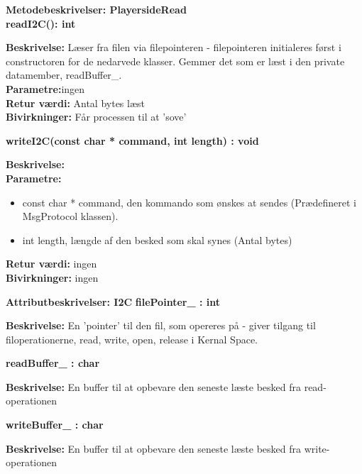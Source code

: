 \documentclass[Softwaredesign/Softwaredesign_main.tex]{subfiles}
\begin{document}
{\large\textbf{Metodebeskrivelser: PlayersideRead}}\\[0.2cm]
\textbf{readI2C(): int}
\begin{adjustwidth}{1cm}{0pt}
\textbf{Beskrivelse:} Læser fra filen via filepointeren - filepointeren initialeres først i constructoren for de nedarvede klasser. Gemmer det som er læst i den private datamember, readBuffer\_.\\[0.2cm]
\textbf{Parametre:}ingen \\[0.2cm]
\textbf{Retur værdi:} Antal bytes læst \\[0.2cm]
\textbf{Bivirkninger:} Får processen til at 'sove'\\[0.2cm]
\end{adjustwidth}

\textbf{writeI2C(const char * command, int length) : void}
\begin{adjustwidth}{1cm}{0pt}
\textbf{Beskrivelse:} \\[0.2cm]
\textbf{Parametre:} 
\begin{itemize}
    \item const char * command, den kommando som ønskes at sendes (Prædefineret i MsgProtocol klassen).
    \item int length, længde af den besked som skal synes (Antal bytes) 
\end{itemize}
\textbf{Retur værdi:} ingen \\[0.2cm]
\textbf{Bivirkninger:} ingen \\[0.2cm]
\end{adjustwidth}

{\large\textbf{Attributbeskrivelser: I2C}}
\textbf{filePointer\_ : int} 
\begin{adjustwidth}{1cm}{0pt}
\textbf{Beskrivelse:} En 'pointer' til den fil, som opereres på - giver tilgang til filoperationerne, read, write, open, release i Kernal Space.\\[0.2cm]
\end{adjustwidth}

\textbf{readBuffer\_ : char}
\begin{adjustwidth}{1cm}{0pt}
\textbf{Beskrivelse:} En buffer til at opbevare den seneste læste besked fra read-operationen\\[0.2cm]
\end{adjustwidth}

\textbf{writeBuffer\_ : char}
\begin{adjustwidth}{1cm}{0pt}
\textbf{Beskrivelse:} En buffer til at opbevare den seneste læste besked fra write-operationen\\[0.2cm]
\end{adjustwidth}
\end{document}
